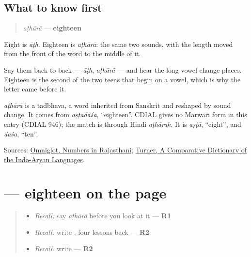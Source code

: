 \subsection*{What to know first}
\begin{quote}
\emph{aṭhārā} — \textbf{eighteen}
\end{quote}

Eight is \emph{āṭh}. Eighteen is \emph{aṭhārā}: the same two sounds, with the length moved from the front of the word to the middle of it.

Say them back to back — \emph{āṭh}, \emph{aṭhārā} — and hear the long vowel change places. Eighteen is the second of the two teens that begin on a vowel, which is why the letter came before it.

\begin{cousinweb}
\emph{aṭhārā} is a tadbhava, a word inherited from Sanskrit and reshaped by sound change. It comes from \emph{aṣṭādaśa}, \textquotedblleft{}eighteen\textquotedblright{}. CDIAL gives no Marwari form in this entry (CDIAL 946); the match is through Hindi \emph{aṭhārah}. It is \emph{aṣṭā}, \textquotedblleft{}eight\textquotedblright{}, and \emph{daśa}, \textquotedblleft{}ten\textquotedblright{}.
\end{cousinweb}

\begin{tcolorbox}[breakable,colback=teal!4,colframe=teal!35!black,title={Before you move on}]
Sources: \href{https://www.omniglot.com/language/numbers/rajasthani.htm}{Omniglot, Numbers in Rajasthani}; \href{https://dsal.uchicago.edu/dictionaries/soas/}{Turner, A Comparative Dictionary of the Indo-Aryan Languages}.
\end{tcolorbox}
\section[\texorpdfstring{\mw{अठारा} (aṭhārā)}{अठारा (aṭhārā)}]{ — eighteen on the page}

\label{lesson:MW-C38-athara}



\begin{quote}
\begin{itemize}
\raggedright
  \item \emph{Recall:} say \emph{aṭhārā} before you look at it — \textbf{R1}
  \item \emph{Recall:} write \textbf{}, four lessons back — \textbf{R2}
  \item \emph{Recall:} write \textbf{} — \textbf{R2}
\end{itemize}
\end{quote}

